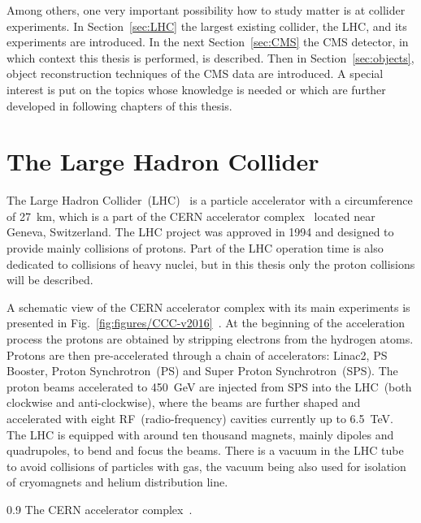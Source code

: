 \clearpage

\setcounter{secnumdepth}{4}
\setcounter{secnumdepth}{5}

Among others, one very important possibility how to study matter is at collider experiments. In Section~\ref{sec:LHC} the largest existing collider, the LHC, and its experiments are introduced. In the next Section~\ref{sec:CMS} the CMS detector, in which context this thesis is performed, is described. Then in Section~\ref{sec:objects}, object reconstruction techniques of the CMS data are introduced. A special interest is put on the topics whose knowledge is needed or which are further developed in following chapters of this thesis.

\section{The Large Hadron Collider~\label{sec:LHC}}

The Large Hadron Collider~(LHC)~\cite{CERN-Brochure-2017-002-Eng, Evans:2008zzb} is a particle accelerator with a circumference of 27~km, which is a part of the CERN accelerator complex~\cite{Mobs:2225847} located near Geneva, Switzerland. The LHC project was approved in 1994 and designed to provide mainly collisions of protons. Part of the LHC operation time is also dedicated to collisions of heavy nuclei, but in this thesis only the proton collisions will be described.

A schematic view of the CERN accelerator complex with its main experiments is presented in Fig.~\ref{fig:figures/CCC-v2016}~\cite{Mobs:2225847}. At the beginning of the acceleration process the protons are obtained by stripping electrons from the hydrogen atoms. Protons are then pre-accelerated through a chain of accelerators: Linac2, PS Booster, Proton Synchrotron~(PS) and Super Proton Synchrotron~(SPS). The proton beams accelerated to 450~GeV are injected from SPS into the LHC~(both clockwise and anti-clockwise), where the beams are further shaped and accelerated with eight RF~(radio-frequency) cavities currently up to 6.5~TeV. The LHC is equipped with around ten thousand magnets, mainly dipoles and quadrupoles, to bend and focus the beams. There is a vacuum in the LHC tube to avoid collisions of particles with gas, the vacuum being also used for isolation of cryomagnets and helium distribution line.

                 {0.9}       %
                 { The CERN accelerator complex~\cite{Mobs:2225847}. }

